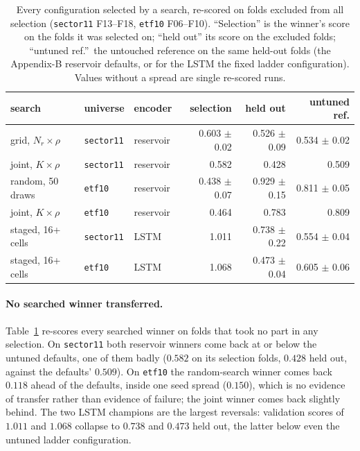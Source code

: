 \begin{table}[t]
  \centering
  \small
  \begin{tabular}{lll rrr}
    \hline
    search & universe & encoder & selection & held out & untuned ref.\\
    \hline
    grid, $N_r\times\rho$ & \texttt{sector11} & reservoir & 0.603 $\pm$ 0.02 & 0.526 $\pm$ 0.09 & 0.534 $\pm$ 0.02 \\
    joint, $K\times\rho$  & \texttt{sector11} & reservoir & 0.582 & 0.428 & 0.509 \\
    random, 50 draws      & \texttt{etf10}    & reservoir & 0.438 $\pm$ 0.07 & 0.929 $\pm$ 0.15 & 0.811 $\pm$ 0.05 \\
    joint, $K\times\rho$  & \texttt{etf10}    & reservoir & 0.464 & 0.783 & 0.809 \\
    staged, 16+ cells     & \texttt{sector11} & LSTM      & 1.011 & 0.738 $\pm$ 0.22 & 0.554 $\pm$ 0.04 \\
    staged, 16+ cells     & \texttt{etf10}    & LSTM      & 1.068 & 0.473 $\pm$ 0.04 & 0.605 $\pm$ 0.06 \\
    \hline
  \end{tabular}
  \caption[Held-out verification of searched winners]{Every configuration
  selected by a search, re-scored on folds excluded from all selection
  (\texttt{sector11} F13--F18, \texttt{etf10} F06--F10). ``Selection'' is the
  winner's score on the folds it was selected on; ``held out'' its score on
  the excluded folds; ``untuned ref.''\ the untouched reference on the same
  held-out folds (the Appendix-B reservoir defaults, or for the LSTM the
  fixed ladder configuration). Values without a spread are single re-scored
  runs.}
  \label{tab:transfer}
\end{table}

\paragraph{No searched winner transferred.}
Table~\ref{tab:transfer} re-scores every searched winner on folds that took no part in any selection. On \texttt{sector11} both reservoir winners come back at or below the untuned defaults, one of them badly ($0.582$ on its selection folds, $0.428$ held out, against the defaults' $0.509$). On \texttt{etf10} the random-search winner comes back $0.118$ ahead of the defaults, inside one seed spread ($0.150$), which is no evidence of transfer rather than evidence of failure; the joint winner comes back slightly behind. The two LSTM champions are the largest reversals: validation scores of $1.011$ and $1.068$ collapse to $0.738$ and $0.473$ held out, the latter below even the untuned ladder configuration.

